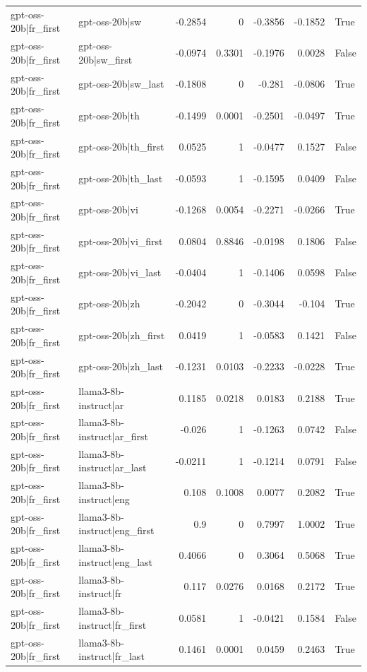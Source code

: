 \begin{table}
\begin{tabular}{l l r r r r l}
gpt-oss-20b|fr_first & gpt-oss-20b|sw & -0.2854 & 0 & -0.3856 & -0.1852 & True \\
gpt-oss-20b|fr_first & gpt-oss-20b|sw_first & -0.0974 & 0.3301 & -0.1976 & 0.0028 & False \\
gpt-oss-20b|fr_first & gpt-oss-20b|sw_last & -0.1808 & 0 & -0.281 & -0.0806 & True \\
gpt-oss-20b|fr_first & gpt-oss-20b|th & -0.1499 & 0.0001 & -0.2501 & -0.0497 & True \\
gpt-oss-20b|fr_first & gpt-oss-20b|th_first & 0.0525 & 1 & -0.0477 & 0.1527 & False \\
gpt-oss-20b|fr_first & gpt-oss-20b|th_last & -0.0593 & 1 & -0.1595 & 0.0409 & False \\
gpt-oss-20b|fr_first & gpt-oss-20b|vi & -0.1268 & 0.0054 & -0.2271 & -0.0266 & True \\
gpt-oss-20b|fr_first & gpt-oss-20b|vi_first & 0.0804 & 0.8846 & -0.0198 & 0.1806 & False \\
gpt-oss-20b|fr_first & gpt-oss-20b|vi_last & -0.0404 & 1 & -0.1406 & 0.0598 & False \\
gpt-oss-20b|fr_first & gpt-oss-20b|zh & -0.2042 & 0 & -0.3044 & -0.104 & True \\
gpt-oss-20b|fr_first & gpt-oss-20b|zh_first & 0.0419 & 1 & -0.0583 & 0.1421 & False \\
gpt-oss-20b|fr_first & gpt-oss-20b|zh_last & -0.1231 & 0.0103 & -0.2233 & -0.0228 & True \\
gpt-oss-20b|fr_first & llama3-8b-instruct|ar & 0.1185 & 0.0218 & 0.0183 & 0.2188 & True \\
gpt-oss-20b|fr_first & llama3-8b-instruct|ar_first & -0.026 & 1 & -0.1263 & 0.0742 & False \\
gpt-oss-20b|fr_first & llama3-8b-instruct|ar_last & -0.0211 & 1 & -0.1214 & 0.0791 & False \\
gpt-oss-20b|fr_first & llama3-8b-instruct|eng & 0.108 & 0.1008 & 0.0077 & 0.2082 & True \\
gpt-oss-20b|fr_first & llama3-8b-instruct|eng_first & 0.9 & 0 & 0.7997 & 1.0002 & True \\
gpt-oss-20b|fr_first & llama3-8b-instruct|eng_last & 0.4066 & 0 & 0.3064 & 0.5068 & True \\
gpt-oss-20b|fr_first & llama3-8b-instruct|fr & 0.117 & 0.0276 & 0.0168 & 0.2172 & True \\
gpt-oss-20b|fr_first & llama3-8b-instruct|fr_first & 0.0581 & 1 & -0.0421 & 0.1584 & False \\
gpt-oss-20b|fr_first & llama3-8b-instruct|fr_last & 0.1461 & 0.0001 & 0.0459 & 0.2463 & True \\

\end{tabular}
\end{table}
